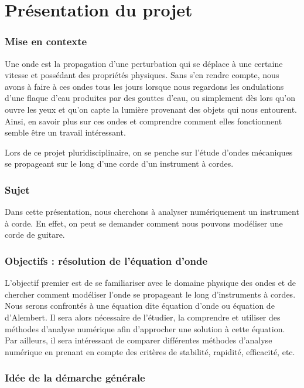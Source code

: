 \part{Présentation du projet}

\section{Mise en contexte}

Une onde est la propagation d'une perturbation qui se déplace à une certaine vitesse et possédant des propriétés physiques. Sans s'en rendre compte, nous avons à faire à ces ondes tous les jours lorsque nous regardons les ondulations d'une flaque d'eau produites par des gouttes d'eau, ou simplement dès lors qu'on ouvre les yeux et qu'on capte la lumière provenant des objets qui nous entourent. Ainsi, en savoir plus sur ces ondes et comprendre comment elles fonctionnent semble être un travail intéressant.

Lors de ce projet pluridisciplinaire, on se penche sur l'étude d'ondes mécaniques se propageant sur le long d'une corde d'un instrument à cordes.


\section{Sujet}

Dans cette présentation, nous cherchons  à analyser numériquement un instrument à corde. En effet, on peut se demander comment nous pouvons modéliser une corde de guitare. 

\section{Objectifs : résolution de l'équation d'onde}

L'objectif premier est de se familiariser avec le domaine physique des ondes et de chercher comment modéliser l'onde se propageant le long d'instruments à cordes. Nous serons confrontés à une équation dite équation d'onde ou équation de d'Alembert. Il sera alors nécessaire de l'étudier, la comprendre et utiliser des méthodes d'analyse numérique afin d'approcher une solution à cette équation. Par ailleurs, il sera intéressant de comparer différentes méthodes d'analyse numérique en prenant en compte des critères de stabilité, rapidité, efficacité, etc.

\section{Idée de la démarche générale}

